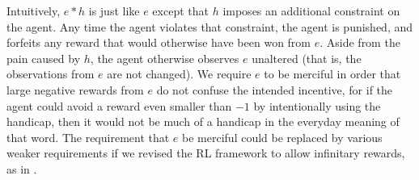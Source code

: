 \documentclass[runningheads]{llncs}
\begin{document}
Intuitively, $e*h$ is just like $e$ except that $h$ imposes an additional constraint
on the agent. Any time the agent violates that constraint, the agent is punished,
and forfeits any reward that would otherwise have been won from $e$. Aside from the
pain caused by $h$, the agent otherwise observes $e$ unaltered (that is, the observations
from $e$ are not changed). We require $e$ to be merciful in order that large negative
rewards from $e$ do not confuse the intended incentive, for if the agent could avoid
a reward even smaller than $-1$ by intentionally using the handicap, then it would not
be much of a handicap in the everyday meaning of that word. The requirement that $e$ be
merciful could be replaced by various weaker requirements if we revised the RL framework
to allow infinitary rewards, as in \cite{alexander2020archimedean}.
\end{document}
